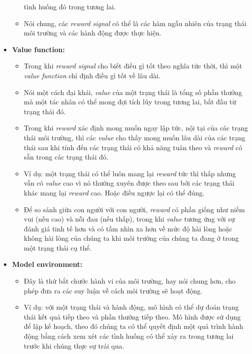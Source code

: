 \begin{itemize}
\begin{itemize}
        tình huống đó trong tương lai.
        \item Nói chung, các \textit{reward signal} có thể là
        các hàm ngẫu nhiên của trạng thái môi trường và
        các hành động được thực hiện.
    \end{itemize}
    \item \textbf{Value function:}
    \begin{itemize}
        \item Trong khi \textit{reward signal} cho biết điều gì tốt
        theo nghĩa tức thời, thì một \textit{value function} chỉ định
        điều gì tốt về lâu dài.
        \item Nói một cách đại khái, \textit{value} của một trạng thái
        là tổng số phần thưởng mà một tác nhân có thể mong đợi tích lũy
        trong tương lai, bắt đầu từ trạng thái đó.
        \item Trong khi \textit{reward} xác định mong muốn ngay lập tức,
        nội tại của các trạng thái môi trường, thì các \textit{value}
        cho thấy mong muốn lâu dài của các trạng thái sau khi tính đến
        các trạng thái có khả năng tuân theo và \textit{reward} có sẵn
        trong các trạng thái đó.
        \item Ví dụ: một trạng thái có thể luôn mang lại \textit{reward}
        tức thì thấp nhưng vẫn có \textit{value} cao vì nó thường xuyên
        được theo sau bởi các trạng thái khác mang lại \textit{reward}
        cao. Hoặc điều ngược lại có thể đúng.
        \item Để so sánh giữa con người với con người, \textit{reward}
        có phần giống như niềm vui (nếu cao) và nỗi đau (nếu thấp),
        trong khi \textit{value} tương ứng với sự đánh giá tinh tế hơn
        và có tầm nhìn xa hơn về mức độ hài lòng hoặc không hài lòng
        của chúng ta khi môi trường của chúng ta đang ở trong
        một trạng thái cụ thể.
    \end{itemize}
    \item \textbf{Model environment:}
    \begin{itemize}
        \item Đây là thứ bắt chước hành vi của môi trường, hay
        nói chung hơn, cho phép đưa ra các suy luận về cách
        môi trường sẽ hoạt động.
        \item Ví dụ: với một trạng thái và hành động, mô hình
        có thể dự đoán trạng thái kết quả tiếp theo và phần thưởng
        tiếp theo. Mô hình được sử dụng để lập kế hoạch, theo đó
        chúng ta có thể quyết định một quá trình hành động bằng cách
        xem xét các tình huống có thể xảy ra trong tương lai
        trước khi chúng thực sự trải qua.
    \end{itemize}
\end{itemize}

